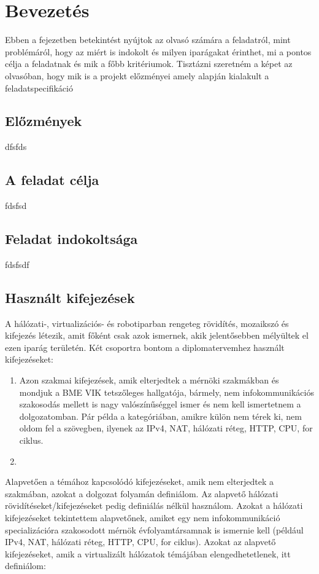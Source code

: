 \chapter{Bevezetés}

Ebben a fejezetben betekintést nyújtok az olvasó számára a feladatról, mint problémáról, hogy az miért is indokolt és milyen iparágakat érinthet, mi a pontos célja a feladatnak és mik a főbb kritériumok. Tisztázni szeretném a képet az olvasóban, hogy mik is a projekt előzményei amely alapján kialakult a feladatspecifikáció

\section{Előzmények}
dfsfds
\section{A feladat célja}
fdsfsd
\section{Feladat indokoltsága}
fdsfsdf


\section{Használt kifejezések}
A hálózati-, virtualizációs- és robotiparban rengeteg rövidítés, mozaikszó és kifejezés létezik, amit főként csak azok ismernek, akik
jelentősebben mélyültek el ezen iparág területén. Két csoportra bontom a diplomatervemhez használt kifejezéseket:
\begin{enumerate}
	\item Azon szakmai kifejezések, amik elterjedtek a mérnöki szakmákban és mondjuk a BME VIK tetszőleges hallgatója, bármely, nem infokommunikációs szakosodás mellett is nagy valószínűséggel ismer és nem kell ismertetnem a dolgozatomban. Pár példa a kategóriában, amikre külön nem térek ki, nem oldom fel a szövegben, ilyenek az IPv4, NAT, hálózati réteg, HTTP, CPU, for ciklus.
	\item 
\end{enumerate}
 Alapvetően a témához kapcsolódó kifejezéseket,
amik nem elterjedtek a szakmában, azokat a dolgozat folyamán definiálom. Az alapvető
hálózati rövidítéseket/kifejezéseket pedig definiálás nélkül használom. Azokat a hálózati
kifejezéseket tekintettem alapvetőnek, amiket egy nem infokommunikáció specializációra
szakosodott mérnök évfolyamtársamnak is ismernie kell (például IPv4, NAT, hálózati réteg,
HTTP, CPU, for ciklus). Azokat az alapvető kifejezéseket, amik a virtualizált hálózatok
témájában elengedhetetlenek, itt definiálom:
